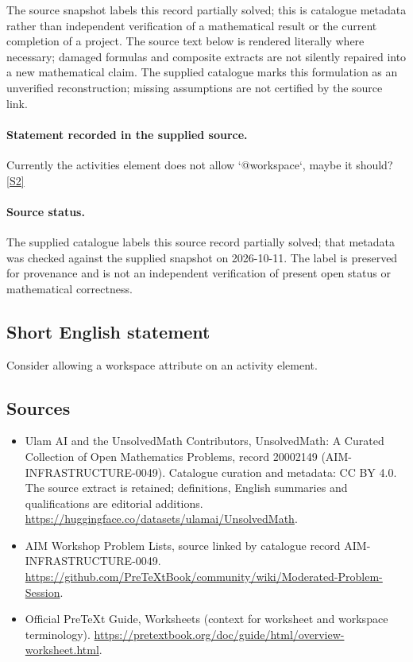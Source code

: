 \documentclass[11pt]{article}
\begin{document}
The source snapshot labels this record partially solved; this is catalogue metadata rather than independent verification of a mathematical result or the current completion of a project.
The source text below is rendered literally where necessary; damaged formulas and composite extracts are not silently repaired into a new mathematical claim.
The supplied catalogue marks this formulation as an unverified reconstruction; missing assumptions are not certified by the source link.
\paragraph{Statement recorded in the supplied source.}
Currently the activities element does not allow `@workspace`, maybe it should? \href{https://github.com/PreTeXtBook/community/wiki/Moderated-Problem-Session}{[S2]}
\paragraph{Source status.}
The supplied catalogue labels this source record partially solved; that metadata was checked against the supplied snapshot on 2026-10-11. The label is preserved for provenance and is not an independent verification of present open status or mathematical correctness.
\subsection{Short English statement}
Consider allowing a workspace attribute on an activity element.
\subsection{Sources}
\begin{itemize}
\item[S1] Ulam AI and the UnsolvedMath Contributors, UnsolvedMath: A Curated Collection of Open Mathematics Problems, record 20002149 (AIM-INFRASTRUCTURE-0049). Catalogue curation and metadata: CC BY 4.0. The source extract is retained; definitions, English summaries and qualifications are editorial additions.
\url{https://huggingface.co/datasets/ulamai/UnsolvedMath}.
\item[S2] AIM Workshop Problem Lists, source linked by catalogue record AIM-INFRASTRUCTURE-0049.
\url{https://github.com/PreTeXtBook/community/wiki/Moderated-Problem-Session}.
\item[S3] Official PreTeXt Guide, Worksheets (context for worksheet and workspace terminology).
\url{https://pretextbook.org/doc/guide/html/overview-worksheet.html}.
\end{itemize}
\end{document}
